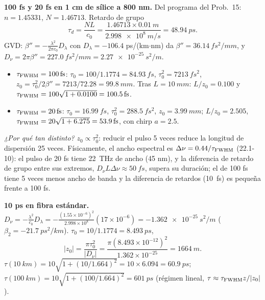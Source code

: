  \textbf{100 fs y 20 fs en 1 cm de sílice a 800 nm.} Del programa del Prob.~15:
$n=1.45331$, $N=1.46713$. Retardo de grupo
\[
\tau_d=\frac{NL}{c_0}=\frac{1.46713\times\SI{0.01}{m}}{\SI{2.998e8}{m/s}}=\SI{48.94}{ps}.
\]
GVD: $\beta''=-\frac{\lambda^2}{2\pi c_0}D_\lambda$ con $D_\lambda=-106.4$ ps/(km$\cdot$nm) da
$\beta''=\SI{36.14}{fs^2/mm}$, y $D_\nu=2\pi\beta''=\SI{227.0}{fs^2/mm}=\SI{2.27e-25}{s^2/m}$.
\begin{itemize}
\item $\tau_{\rm FWHM}=\SI{100}{fs}$: $\tau_0=100/1.1774=\SI{84.93}{fs}$, $\tau_0^2=\SI{7213}{fs^2}$,
$z_0=\tau_0^2/2\beta''=7213/72.28=\SI{99.8}{mm}$. Tras $L=\SI{10}{mm}$: $L/z_0=0.100$ y
$\tau_{\rm FWHM}=100\sqrt{1+0.0100}=\SI{100.5}{fs}$.
\item $\tau_{\rm FWHM}=\SI{20}{fs}$: $\tau_0=\SI{16.99}{fs}$, $\tau_0^2=\SI{288.5}{fs^2}$, $z_0=\SI{3.99}{mm}$; $L/z_0=2.505$,
$\tau_{\rm FWHM}=20\sqrt{1+6.275}=\SI{53.9}{fs}$, con chirp $a=2.5$.
\end{itemize}
\emph{¿Por qué tan distinto?} $z_0\propto\tau_0^2$: reducir el pulso 5 veces reduce la longitud de
dispersión 25 veces. Físicamente, el ancho espectral es $\Delta\nu=0.44/\tau_{\rm FWHM}$ (22.1-10): el pulso de
20 fs tiene \SI{22}{THz} de ancho (45 nm), y la diferencia de retardo de grupo entre sus extremos,
$D_\nu L\Delta\nu\approx\SI{50}{fs}$, supera su duración; el de 100 fs tiene 5 veces menos ancho de banda y
la diferencia de retardos (\SI{10}{fs}) es pequeña frente a 100 fs.

 \textbf{10 ps en fibra estándar.} $D_\nu=-\frac{\lambda^2}{c_0}D_\lambda=-\frac{(1.55\times10^{-6})^2}{2.998\times10^8}(17\times10^{-6})=\SI{-1.362e-25}{s^2/m}$
($\beta_2=\SI{-21.7}{ps^2/km}$). $\tau_0=10/1.1774=\SI{8.493}{ps}$,
\[
|z_0|=\frac{\pi\tau_0^2}{|D_\nu|}=\frac{\pi(8.493\times10^{-12})^2}{1.362\times10^{-25}}=\SI{1664}{m}.
\]
$\tau(\SI{10}{km})=10\sqrt{1+(10/1.664)^2}=10\times6.094=\SI{60.9}{ps}$;
$\tau(\SI{100}{km})=10\sqrt{1+(100/1.664)^2}=\SI{601}{ps}$ (régimen lineal, $\tau\approx\tau_{\rm FWHM}z/|z_0|$).

